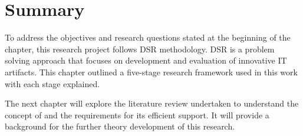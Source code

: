 \section{Summary}

To address the objectives and research questions stated at the beginning of the
chapter, this research project follows DSR methodology. DSR is a problem solving
approach that focuses on development and evaluation of innovative IT artifacts.
This chapter outlined a five-stage research framework used in this work with
each stage explained.

The next chapter will explore the literature review undertaken to understand the
concept of \LLLs and the requirements for its efficient support. It will provide
a background for the further theory development of this research.
